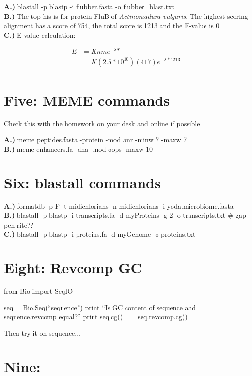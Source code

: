 \documentclass[10pt]{article} %
\begin{document}
\textbf{A.)} blastall -p blastp -i flubber.fasta -o flubber\_blast.txt\\
\textbf{B.)} The top his is for protein FluB of \textit{Actinomadura vulgaris}.
The highest scoring alignment has a score of 754, the total score is 1213 and the
E-value is 0.\\
\textbf{C.)} E-value calculation:

\begin{align*}
  E &= Knme^{-\lambda S}\\
  &= K(2.5*10^{10})(417)e^{-\lambda * 1213}\\
\end{align*}

\section{Five: MEME commands}

Check this with the homework on your desk and online if possible

\textbf{A.)} meme peptides.fasta -protein -mod anr -minw 7 -maxw 7\\
\textbf{B.)} meme enhancers.fa -dna -mod oops -maxw 10\\

\section{Six: blastall commands}
\textbf{A.)} formatdb -p F -t midichlorians -n midichlorians -i yoda.microbiome.fasta\\
\textbf{B.)} blastall -p blastp -i transcripts.fa -d myProteins  -g 2 -o transcripts.txt # gap pen rite??\\
\textbf{C.)} blastall -p blastp -i proteins.fa -d myGenome -o proteins.txt\\

\section{Eight: Revcomp GC}

from Bio import SeqIO

seq = Bio.Seq(``sequence'')
print ``Is GC content of sequence and sequence.revcomp equal?''
print seq.cg() == seq.revcomp.cg()

Then try it on sequence...

\section{Nine: }
\end{document}
